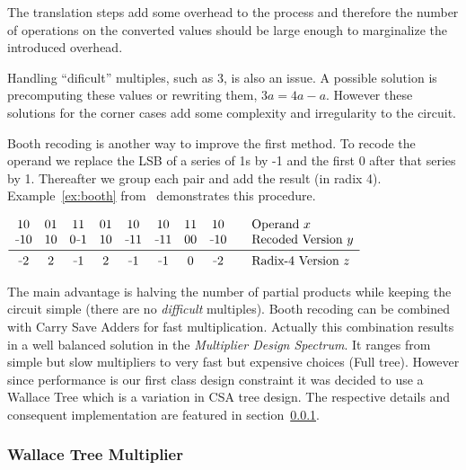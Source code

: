 The translation steps add some overhead to the process and therefore the number of operations on the converted values should be large enough to marginalize the introduced overhead.

Handling ``dificult'' multiples, such as 3, is also an issue. A possible solution is precomputing these values or rewriting them, \eg $3a = 4a - a$. However these solutions for the corner cases add some complexity and irregularity to the circuit.

Booth recoding is another way to improve the first method. To recode the operand we replace the LSB of a series of 1s by -1 and the first 0 after that series by 1. Thereafter we group each pair and add the result (in radix 4). Example~\ref{ex:booth} from~\cite{book} demonstrates this procedure.

\begin{center}
\captionsetup{type=table}
$\begin{array}{ccccccccl}
10  & 01 & 11  & 01 & 10 & 10 & 11 & 10 & \quad\text{Operand } x\\
\unaryminus10 & 10 & 0\unaryminus1 & 10 & \unaryminus11 & \unaryminus11 & 00 & \unaryminus10 &\quad \text{Recoded Version } y\\
\midrule
\unaryminus2 & 2 & \unaryminus1 & 2 & \unaryminus1 & \unaryminus1 & 0 & \unaryminus2 & \quad\text{Radix-4 Version } z\\ 
\end{array}$
\label{ex:booth}
\end{center}

The main advantage is halving the number of partial products while keeping the circuit simple (there are no \emph{difficult} multiples).
Booth recoding can be combined with Carry Save Adders for fast multiplication. Actually this combination results in a well balanced solution in the \emph{Multiplier Design Spectrum}. It ranges from simple but slow multipliers to very fast but expensive choices (\ie Full tree).
However since performance is our first class design constraint it was decided to use a Wallace Tree which is a variation in CSA tree design. The respective details and consequent implementation are featured in section~\ref{sec:wallace}.

\subsubsection{Wallace Tree Multiplier}
\label{sec:wallace}

